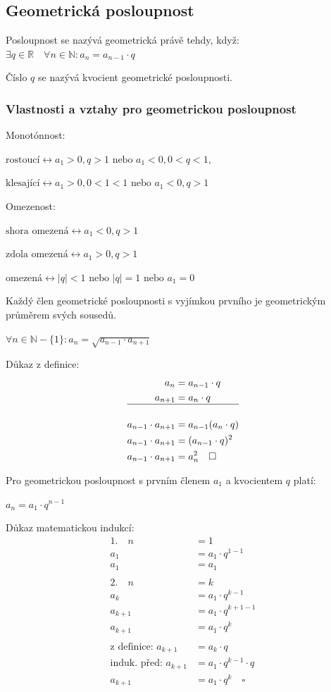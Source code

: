 \documentclass[12pt]{article}
\begin{document}
\subsection*{Geometrická posloupnost}
Posloupnost se nazývá geometrická právě tehdy, když: $\exists q \in \mathbb{R} \quad \forall n \in
\mathbb{N} : a_n = a_{n-1} \cdot q$

Číslo $q$ se nazývá kvocient geometrické posloupnosti.
\subsubsection*{Vlastnosti a vztahy pro geometrickou posloupnost}
Monotónnost:

$\text{rostoucí} \leftrightarrow a_1 > 0, q > 1 \text{ nebo } a_1 < 0, 0 < q < 1$,

$\text{klesající} \leftrightarrow a_1 > 0, 0 < 1 < 1 \text{ nebo } a_1 < 0, q > 1$

Omezenost:

$\text{shora omezená} \leftrightarrow a_1 < 0, q > 1$

$\text{zdola omezená} \leftrightarrow a_1 > 0, q > 1$

$\text{omezená} \leftrightarrow |q| < 1 \text{ nebo } |q| = 1 \text{ nebo } a_1 = 0$

Každý člen geometrické posloupnosti s vyjímkou prvního je geometrickým průměrem svých sousedů.

$\forall n \in \mathbb{N} - \{1\} : a_n = \sqrt{a_{n-1} \cdot a_{n+1}}$

Důkaz z definice:
\[
\begin{align*}
    a_n &= a_{n-1} \cdot q \\
    a_{n+1} &= a_n \cdot q \\ \hline \\
    a_{n-1} \cdot a_{n+1} &= a_{n-1}(a_n \cdot q) \\
    a_{n-1} \cdot a_{n+1} &= (a_{n-1} \cdot q)^2 \\
    a_{n-1} \cdot a_{n+1} &= a_n^2 \quad \square
\end{align*}
\]

Pro geometrickou posloupnost s prvním členem $a_1$ a kvocientem $q$ platí:

$a_n = a_1 \cdot q^{n-1}$

Důkaz matematickou indukcí:
\[
\begin{align*}
    1. \quad n &= 1 \\
    a_1 &= a_1 \cdot q^{1-1} \\
    a_1 &= a_1 \\\\
    2. \quad n &= k \\
    a_k &= a_1 \cdot q^{k-1} \\
    a_{k+1} &= a_1 \cdot q^{k+1-1} \\
    a_{k+1} &= a_1 \cdot q^k \\\\
    \text{z definice: } a_{k+1} &= a_k \cdot q \\
    \text{induk. před: } a_{k+1} &= a_1 \cdot q^{k-1} \cdot q \\
    a_{k+1} &= a_1 \cdot q^k \quad \square
\end{align*}
\]
\end{document}
